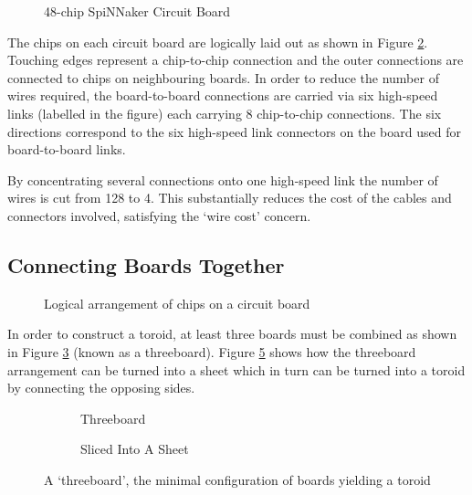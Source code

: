 			\begin{figure}
				\center
				
				\caption{48-chip SpiNNaker Circuit Board}
				\label{fig:spinn4labelled}
			\end{figure}
			
			The chips on each circuit board are logically laid out as shown in Figure
			\ref{fig:chipsOnBoard}. Touching edges represent a chip-to-chip connection
			and the outer connections are connected to chips on neighbouring boards.
			In order to reduce the number of wires required, the board-to-board
			connections are carried via six high-speed links (labelled in the figure)
			each carrying 8 chip-to-chip connections. The six directions correspond to
			the six high-speed link connectors on the board used for board-to-board
			links.
			
			By concentrating several connections onto one high-speed link the number
			of wires is cut from 128 to 4. This substantially reduces the cost of the
			cables and connectors involved, satisfying the `wire cost' concern.
		
		\subsection{Connecting Boards Together}
			
			\label{ref:connectingBoardsTogether}
			
			\begin{figure}
				\center
				
				\caption{Logical arrangement of chips on a circuit board}
				\label{fig:chipsOnBoard}
			\end{figure}
			
			In order to construct a toroid, at least three boards  must be combined as
			shown in Figure \ref{fig:threeboard} (known as a threeboard).  Figure
			\ref{fig:threeboardSliced} shows how the threeboard arrangement can be
			turned into a sheet which in turn can be turned into a toroid by connecting
			the opposing sides.
			
			\begin{figure}
				\begin{subfigure}[b]{0.45\textwidth}
					\center
					
					\caption{Threeboard}
					\label{fig:threeboard}
				\end{subfigure}
				\begin{subfigure}[b]{0.45\textwidth}
					\center
					
					\caption{Sliced Into A Sheet}
					\label{fig:threeboardSliced}
				\end{subfigure}
				
				\caption[A `threeboard']{A `threeboard', the minimal configuration of boards yielding a
				toroid}
			\end{figure}
			
